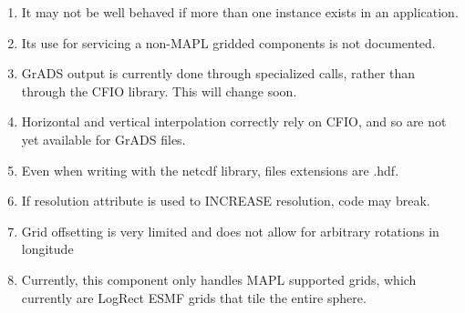  \begin{enumerate}
 \item It may not be well behaved if more than one instance exists in an application.
 \item Its use for servicing a non-MAPL gridded components is not documented.
 \item GrADS output is currently done through specialized calls, rather than through the 
       CFIO library. This will change soon.
 \item Horizontal and vertical interpolation correctly 
       rely on CFIO, and so are not yet available for GrADS files.
 \item Even when writing with the netcdf library, files extensions are .hdf.
 \item If resolution attribute is used to INCREASE resolution, code may break.   
 \item Grid offsetting is very limited and does not allow for arbitrary rotations
       in longitude 
 \item Currently, this component only handles MAPL supported grids, which currently are 
       LogRect ESMF grids that tile the entire sphere.

 \end{enumerate}

  
